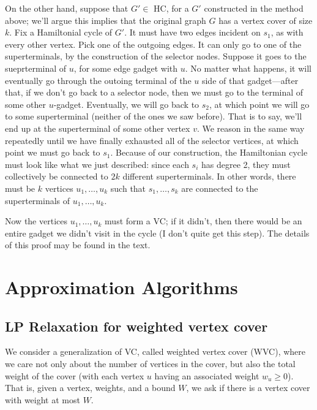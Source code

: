 \documentclass{article}
\begin{document}
On the other hand, suppose that $G'\in$ HC, for a $G'$ constructed in the
method above; we'll argue this implies that the original graph $G$ has a 
vertex cover of size $k$.
Fix a Hamiltonial cycle of $G'$.
It must have two edges incident on $s_1$, as with every other vertex.
Pick one of the outgoing edges. It can only go to one of the superterminals,
by the construction of the selector nodes.
Suppose it goes to the sueprterminal of $u$, for some edge gadget with $u$.
No matter what happens, it will eventually go through the outoing terminal
of the $u$ side of that gadget---after that, if we don't go back to a
selector node, then we must go to the terminal of some other $u$-gadget.
Eventually, we will go back to $s_2$, at which point we will go to
some superterminal (neither of the ones we saw before). That is to say,
we'll end up at the superterminal of some other vertex $v$.
We reason in the same way repeatedly until we have finally exhausted all of the
selector vertices, at which point we must go back to $s_1$.
Because of our construction, the Hamiltonian cycle must look like what we
just described: since each $s_i$ has degree 2, they must collectively
be connected to $2k$ different superterminals.
In other words, there must be $k$ vertices $u_1,\ldots,u_k$ such that
$s_1,\ldots,s_k$ are connected to the
superterminals of $u_1,\ldots,u_k$.

Now the vertices $u_1,\ldots,u_k$ must form a VC; if it didn't, then there
would be an entire gadget we didn't visit in the cycle (I don't quite
get this step). The details of this proof may be found in the text.





\section{Approximation Algorithms}

\subsection{LP Relaxation for weighted vertex cover}

We consider a generalization of VC, called weighted vertex cover (WVC),
where we care not only about the number of vertices in the cover, but
also the total weight of the cover (with each vertex $u$ having
an associated weight $w_u \geq 0$). That is, given a vertex, weights, 
and a bound $W$, we ask if there is a vertex cover with weight
at most $W$.
\end{document}

